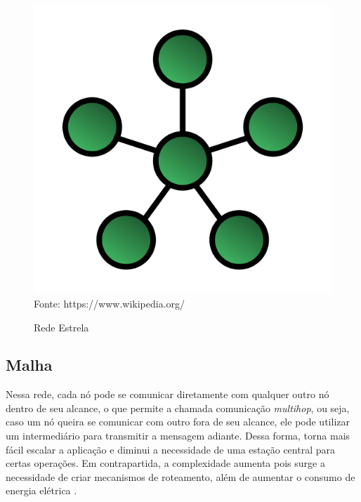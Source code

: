 \begin{figure}[h]
	\caption{Rede Estrela}
	\centering
	\includegraphics[scale=0.25]{../images/star.png}
	\hspace{\linewidth}
	Fonte: https://www.wikipedia.org/
	\label{figura:star}
\end{figure}

\subsection{Malha}
Nessa rede, cada nó pode se comunicar diretamente com qualquer outro nó dentro de seu alcance, o que permite a
chamada comunicação \textit{multihop}, ou seja, caso um nó queira se comunicar com outro fora de seu alcance,
ele pode utilizar um intermediário para transmitir a mensagem adiante. Dessa forma, torna mais fácil escalar a
aplicação e diminui a necessidade de uma estação central para certas operações. Em contrapartida, a
complexidade aumenta pois surge a necessidade de criar mecanismos de roteamento, além de aumentar o consumo de
energia elétrica \cite{townsend_arms2005}.

